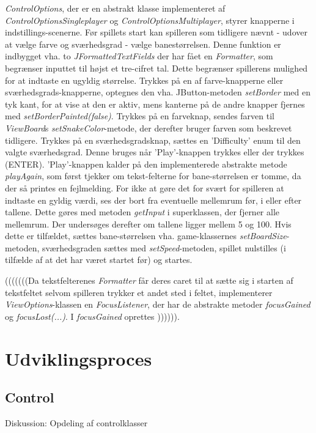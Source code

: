 \textit{ControlOptions}, der er en abstrakt klasse implementeret af \textit{ControlOptionsSingleplayer} og \textit{ControlOptionsMultiplayer}, styrer knapperne i indstillings-scenerne. Før spillets start kan spilleren som tidligere nævnt - udover at vælge farve og sværhedsgrad - vælge banestørrelsen. Denne funktion er indbygget vha. to \textit{JFormattedTextFields} der har fået en \textit{Formatter}, som begrænser inputtet til højst et tre-cifret tal. Dette begrænser spillerens mulighed for at indtaste en ugyldig størrelse. Trykkes på en af farve-knapperne eller sværhedsgrads-knapperne, optegnes den vha. JButton-metoden \textit{setBorder} med en tyk kant, for at vise at den er aktiv, mens kanterne på de andre knapper fjernes med \textit{setBorderPainted(false)}. Trykkes på en farveknap, sendes farven til \textit{ViewBoard}s \textit{setSnakeColor}-metode, der derefter bruger farven som beskrevet tidligere. Trykkes på en sværhedsgradsknap, sættes  en 'Difficulty' enum til den valgte sværhedsgrad. Denne bruges når 'Play'-knappen trykkes eller der trykkes (ENTER). 'Play'-knappen kalder på den implementerede abstrakte metode \textit{playAgain}, som først tjekker om tekst-felterne for bane-størrelsen er tomme, da der så printes en fejlmelding. For ikke at gøre det for svært for spilleren at indtaste en gyldig værdi, ses der bort fra eventuelle mellemrum før, i eller efter tallene. Dette gøres med metoden \textit{getInput} i superklassen, der fjerner alle mellemrum. Der undersøges derefter om tallene ligger mellem 5 og 100. Hvis dette er tilfældet, sættes bane-størrelsen vha. game-klassernes \textit{setBoardSize}-metoden, sværhedsgraden sættes med \textit{setSpeed}-metoden, spillet nulstilles (i tilfælde af at det har været startet før) og startes.

(((((((Da tekstfelterenes \textit{Formatter} får deres caret til at sætte sig i starten af tekstfeltet selvom spilleren trykker et andet sted i feltet, implementerer \textit{ViewOptions}-klassen en \textit{FocusListener}, der har de abstrakte metoder \textit{focusGained} og \textit{focusLost(...)}. I \textit{focusGained} oprettes )))))).

\section{Udviklingsproces}
\subsection{Control}
Diskussion: Opdeling af controlklasser

